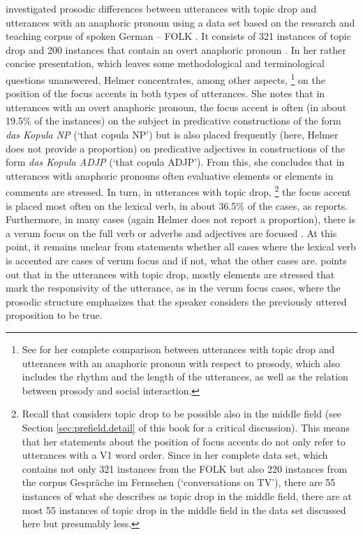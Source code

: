 \citet{helmer2016} investigated prosodic differences between utterances with topic drop and utterances with an anaphoric pronoun using a data set based on the research and teaching corpus of spoken German – FOLK  \citep{schmidt2014}.
It consists of 321 instances of topic drop and 200 instances that contain an overt anaphoric pronoun \citep[217]{helmer2016}.
In her rather concise presentation, which leaves some methodological and terminological questions unanswered, Helmer concentrates, among other aspects,%
\footnote{See \citet[216--227]{helmer2016} for her complete comparison between utterances with topic drop and utterances with an anaphoric pronoun with respect to prosody, which also includes the rhythm and the length of the utterances, as well as the relation between prosody and social interaction.}
%
on the position of the focus accents  in both types of utterances.
She notes that in utterances with an overt anaphoric pronoun, the focus accent is often (in about 19.5\% of the instances) on the subject in predicative constructions of the form \textit{das Kopula NP} (`that copula NP')  but is also placed frequently (here, Helmer does not provide a proportion) on predicative adjectives in constructions of the form \textit{das Kopula ADJP} (`that copula ADJP').
From this, she concludes that in utterances with anaphoric pronouns often evaluative elements or elements in comments are stressed.
In turn, in utterances with topic drop,%
\footnote{Recall that \citet{helmer2016} considers topic drop to be possible also in the middle field (see Section \ref{sec:prefield.detail} of this book for a critical discussion).
This means that her statements about the position of focus accents  do not only refer to utterances with a V1 word order.
Since in her complete data set, which contains not only 321 instances from the FOLK but also 220 instances from the corpus  Gespräche im Fernsehen (`conversations on TV'), there are 55 instances of what she describes as topic drop in the middle field, there are at most 55 instances of topic drop in the middle field in the data set discussed here but presumably less.}
%
the focus  accent is placed most often on the lexical verb, in about 36.5\% of the cases, as \citet[217]{helmer2016} reports.
Furthermore, in many cases (again Helmer does not report a proportion), there is a verum focus  \citep[e.g.,][]{hoehle1992} on the full verb or adverbs and adjectives are focused \citep[217--218]{helmer2016}.
At this point, it remains unclear from  statements whether all cases where the lexical verb is accented are cases of verum focus  and if not, what the other cases are.
\citet[218]{helmer2016} points out that in the utterances with topic drop, mostly elements are stressed that mark the responsivity of the utterance, as in the verum focus  cases, where the prosodic structure emphasizes that the speaker considers the previously uttered proposition to be true.

